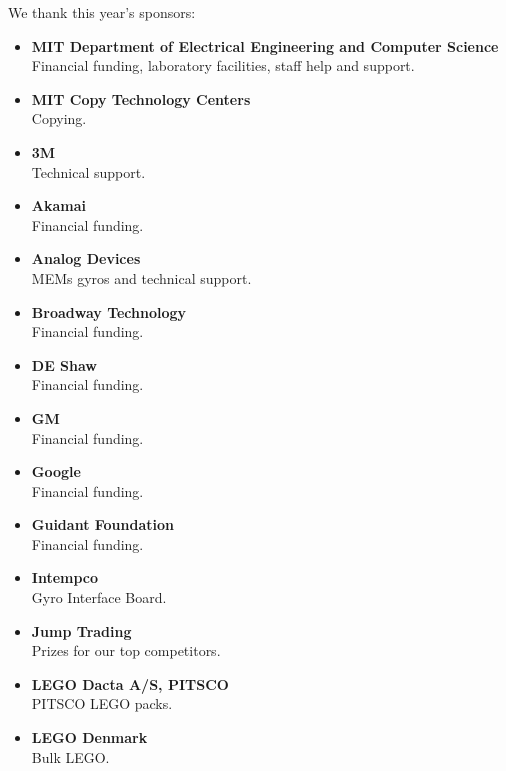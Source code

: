 \documentclass[12pt]{book}
\begin{document}
\beforepreface

We thank this year's sponsors:
\begin{itemize}

\item {\bf MIT Department of Electrical Engineering and Computer Science}\\
Financial funding, laboratory facilities, staff help and support.

\item {\bf MIT Copy Technology Centers}\\
Copying.

\item {\bf 3M}\\
Technical support.

\item {\bf Akamai}\\
Financial funding.

\item {\bf Analog Devices}\\
MEMs gyros and technical support.

\item {\bf Broadway Technology}\\
Financial funding.

\item {\bf DE Shaw}\\
Financial funding.

\item {\bf GM}\\
Financial funding.

\item {\bf Google}\\
Financial funding.

\item {\bf Guidant Foundation}\\
Financial funding.

\item {\bf Intempco}\\
Gyro Interface Board.

\item {\bf Jump Trading}\\
Prizes for our top competitors.

\item {\bf LEGO Dacta A/S, PITSCO}\\
PITSCO LEGO packs.

\item {\bf LEGO Denmark}\\
Bulk LEGO.


\end{itemize}
\end{document}
